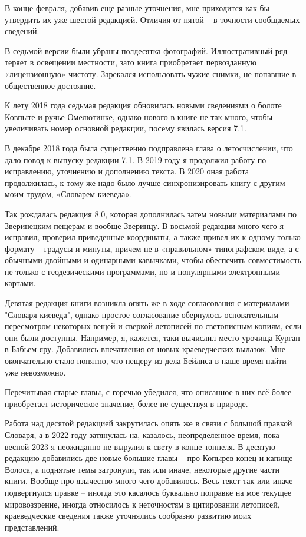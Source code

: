 В конце февраля, добавив еще разные уточнения, мне приходится как бы утвердить их уже шестой редакцией. Отличия от пятой – в точности сообщаемых сведений. 

В седьмой версии были убраны полдесятка фотографий. Иллюстративный ряд теряет в освещении местности, зато книга приобретает первозданную «лицензионную» чистоту. Зарекался использовать чужие снимки, не попавшие в общественное достояние.

К лету 2018 года седьмая редакция обновилась новыми сведениями о болоте Ковпыте и ручье Омелютинке, однако нового в книге не так много, чтобы увеличивать номер основной редакции, посему явилась версия 7.1.

В декабре 2018 года была существенно подправлена глава о летосчислении, что дало повод к выпуску редакции 7.1. В 2019 году я продолжил работу по исправлению, уточнению и дополнению текста. В 2020 оная работа продолжилась, к тому же надо было лучше синхронизировать книгу с другим моим трудом, «Словарем киеведа». 

Так рождалась редакция 8.0, которая дополнилась затем новыми материалами по Зверинецким пещерам и вообще Зверинцу. В восьмой редакции много чего я исправил, проверил приведенные координаты, а также привел их к одному только формату – градусы и минуты, причем не в «правильном» типографском виде, а с обычными двойными и одинарными кавычками, чтобы обеспечить совместимость не только с геодезическими программами, но и популярными электронными картами. 

Девятая редакция книги возникла опять же в ходе согласования с материалами "Словаря киеведа", однако простое согласование обернулось основательным пересмотром некоторых вещей и сверкой летописей по светописным копиям, если они были доступны. Например, я, кажется, таки вычислил место урочища Курган в Бабьем яру. Добавились впечатления от новых краеведческих вылазок. Мне окончательно стало понятно, что пещеру из дела Бейлиса в наше время найти уже невозможно.

Перечитывая старые главы, с горечью убедился, что описанное в них всё более приобретает историческое значение, более не существуя в природе.

Работа над десятой редакцией закрутилась опять же в связи с большой правкой Словаря, а в 2022 году затянулась на, казалось, неопределенное время, пока весной 2023 я неожиданно не вырулил к свету в конце тоннеля. В десятую редакцию добавились две новые большие главы – про Копырев конец и капище Волоса, а поднятые темы затронули, так или иначе, некоторые другие части книги. Вообще про язычество много чего добавилось. Весь текст так или иначе подвергнулся правке – иногда это касалось буквально поправке на мое текущее мировоззрение, иногда относилось к неточностям в цитировании летописей, краеведческие сведения также уточнялись сообразно развитию моих представлений.

